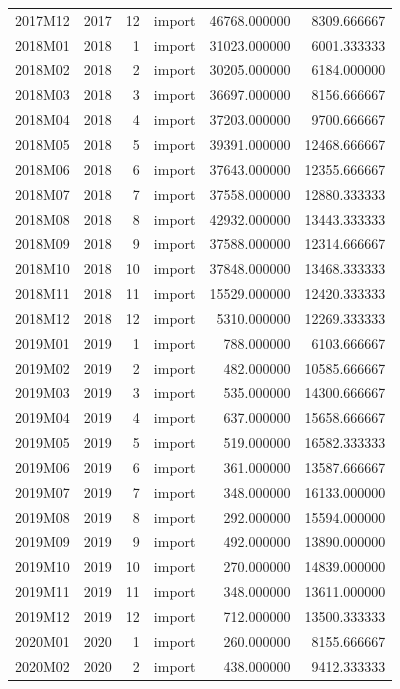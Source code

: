 \begin{tabular}{lrrlrr}
2017M12 & 2017 & 12 & import & 46768.000000 & 8309.666667 \\
2018M01 & 2018 & 1 & import & 31023.000000 & 6001.333333 \\
2018M02 & 2018 & 2 & import & 30205.000000 & 6184.000000 \\
2018M03 & 2018 & 3 & import & 36697.000000 & 8156.666667 \\
2018M04 & 2018 & 4 & import & 37203.000000 & 9700.666667 \\
2018M05 & 2018 & 5 & import & 39391.000000 & 12468.666667 \\
2018M06 & 2018 & 6 & import & 37643.000000 & 12355.666667 \\
2018M07 & 2018 & 7 & import & 37558.000000 & 12880.333333 \\
2018M08 & 2018 & 8 & import & 42932.000000 & 13443.333333 \\
2018M09 & 2018 & 9 & import & 37588.000000 & 12314.666667 \\
2018M10 & 2018 & 10 & import & 37848.000000 & 13468.333333 \\
2018M11 & 2018 & 11 & import & 15529.000000 & 12420.333333 \\
2018M12 & 2018 & 12 & import & 5310.000000 & 12269.333333 \\
2019M01 & 2019 & 1 & import & 788.000000 & 6103.666667 \\
2019M02 & 2019 & 2 & import & 482.000000 & 10585.666667 \\
2019M03 & 2019 & 3 & import & 535.000000 & 14300.666667 \\
2019M04 & 2019 & 4 & import & 637.000000 & 15658.666667 \\
2019M05 & 2019 & 5 & import & 519.000000 & 16582.333333 \\
2019M06 & 2019 & 6 & import & 361.000000 & 13587.666667 \\
2019M07 & 2019 & 7 & import & 348.000000 & 16133.000000 \\
2019M08 & 2019 & 8 & import & 292.000000 & 15594.000000 \\
2019M09 & 2019 & 9 & import & 492.000000 & 13890.000000 \\
2019M10 & 2019 & 10 & import & 270.000000 & 14839.000000 \\
2019M11 & 2019 & 11 & import & 348.000000 & 13611.000000 \\
2019M12 & 2019 & 12 & import & 712.000000 & 13500.333333 \\
2020M01 & 2020 & 1 & import & 260.000000 & 8155.666667 \\
2020M02 & 2020 & 2 & import & 438.000000 & 9412.333333 \\

\end{tabular}
